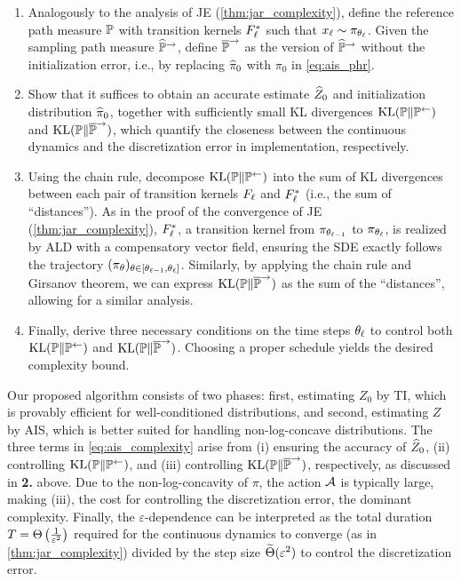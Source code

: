 \begin{enumerate}[wide=0pt,itemsep=0pt, topsep=0pt,parsep=0pt,partopsep=0pt]
    \item Analogously to the analysis of JE (\cref{thm:jar_complexity}), define the reference path measure $\P$ with transition kernels $F^*_\l$ such that $x_\l\sim\pi_{\theta_\l}$.
    Given the sampling path measure $\Phr$, define $\Pbr$ as the version of $\Phr$ without the initialization error, i.e., by replacing $\pih_0$ with $\pi_0$ in \cref{eq:ais_phr}. 
    \item Show that it suffices to obtain an accurate estimate $\Zh_0$ and initialization distribution $\pih_0$, together with sufficiently small KL divergences $\kl(\P\|\Pl)$ and $\kl(\P\|\Pbr)$, which quantify the closeness between the continuous dynamics and the discretization error in implementation, respectively.
    \item Using the chain rule, decompose $\kl(\P\|\Pl)$ into the sum of KL divergences between each pair of transition kernels $F_\l$ and $F^*_\l$ (i.e., the sum of  ``distances''). As in the proof of the convergence of JE (\cref{thm:jar_complexity}), $F^*_\l$, a transition kernel from $\pi_{\theta_{\l-1}}$ to $\pi_{\theta_\l}$, is realized by ALD with a compensatory vector field, ensuring the SDE exactly follows the trajectory $(\pi_\theta)_{\theta\in[\theta_{\l-1},\theta_\l]}$. 
    Similarly, by applying the chain rule and Girsanov theorem, we can express $\kl(\P\|\Pbr)$ as the sum of the  ``distances'', allowing for a similar analysis.
    \item Finally, derive three necessary conditions on the time steps $\theta_{\l}$ to control both $\kl(\P\|\Pl)$ and $\kl(\P\|\Pbr)$. Choosing a proper schedule yields the desired complexity bound.
\end{enumerate}

Our proposed algorithm consists of two phases: first, estimating $Z_0$ by TI, which is provably efficient for well-conditioned distributions, and second, estimating $Z$ by AIS, which is better suited for handling non-log-concave distributions. 
The three terms in \cref{eq:ais_complexity} arise from (i) ensuring the accuracy of $\Zh_0$, (ii) controlling $\kl(\P\|\Pl)$, and (iii) controlling $\kl(\P\|\Pbr)$, respectively, as discussed in \textbf{2.} above.
Due to the non-log-concavity of $\pi$, the action $\cA$ is typically large, making (iii), the cost for controlling the discretization error, the dominant complexity.
Finally, the $\varepsilon$-dependence can be interpreted as the total duration $T=\Theta\ro{\frac{1}{\varepsilon^2}}$ required for the continuous dynamics to converge (as in \cref{thm:jar_complexity}) divided by the step size $\Thetat(\varepsilon^2)$ to control the discretization error.